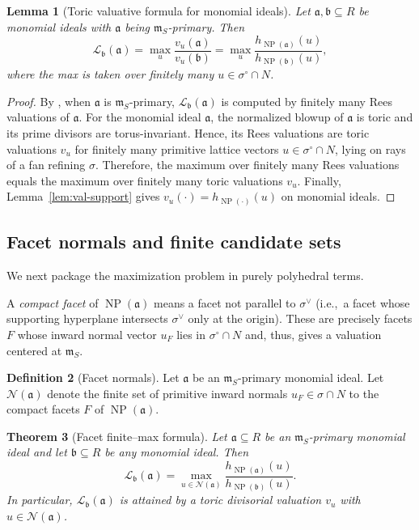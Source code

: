 \documentclass[12pt]{amsart}
\newcommand{\m}{\mathfrak m}
\renewcommand{\a}{\mathfrak{a}}
\renewcommand{\b}{\mathfrak{b}}
\newcommand{\Loj}{\mathcal{L}} %
\DeclareMathOperator{\NP}{NP}
\theoremstyle{plain}
\newtheorem{theorem}{Theorem}[section]
\newtheorem{lemma}[theorem]{Lemma}
\theoremstyle{definition}
\newtheorem{definition}[theorem]{Definition}
\numberwithin{equation}{section}
\begin{document}
\begin{lemma}[Toric valuative formula for monomial ideals]\label{prop:toric-valuative}
	Let $\a,\b\subseteq R$ be monomial ideals with $\a$ being $\m_S$-primary.
	Then
	\[
	\Loj_{\b}(\a)
	=
	\max_u \frac{v_u(\a)}{v_u(\b)}
	=
	\max_u \frac{h_{\NP(\a)}(u)}{h_{\NP(\b)}(u)},
	\]
	where the max is taken over finitely many $u \in \sigma^\circ \cap N$.
\end{lemma}

\begin{proof}
	By , when $\a$ is $\m_S$-primary,
	$\Loj_{\b}(\a)$ is computed by finitely many Rees valuations of $\a$.
	For the monomial ideal $\a$, the normalized blowup of $\a$ is toric and its prime divisors
	are torus-invariant. Hence, its Rees valuations are toric valuations $v_u$
	for finitely many primitive lattice vectors $u \in \sigma^\circ \cap N$, lying on rays of a fan refining $\sigma$.
	Therefore, the maximum over finitely many Rees valuations equals the maximum over finitely many toric
	valuations $v_u$.
	Finally, Lemma~\ref{lem:val-support} gives $v_u(\cdot)=h_{\NP(\cdot)}(u)$ on monomial ideals.
\end{proof}

\subsection{Facet normals and finite candidate sets}

We next package the maximization problem in purely polyhedral terms.

A \emph{compact facet} of $\NP(\a)$ means a facet not parallel to $\sigma^\vee$
(i.e.,\ a facet whose supporting hyperplane intersects $\sigma^\vee$ only at the origin).
These are precisely facets $F$ whose inward normal vector $u_F$ lies in $\sigma^\circ \cap N$ and, thus, gives a valuation centered at $\m_S$.

\begin{definition}[Facet normals]\label{def:facet-normals}
	Let $\a$ be an $\m_S$-primary monomial ideal.
	Let $\mathcal N(\a)$ denote the finite set of primitive inward normals $u_F\in\sigma\cap N$
	to the compact facets $F$ of $\NP(\a)$.
\end{definition}

\begin{theorem}[Facet finite--max formula]\label{thm:facet-formula}
	Let $\a\subseteq R$ be an $\m_S$-primary monomial ideal and let $\b\subseteq R$ be any monomial ideal.
	Then
	\[
	\Loj_{\b}(\a)
	=
	\max_{u\in\mathcal N(\a)}\frac{h_{\NP(\a)}(u)}{h_{\NP(\b)}(u)}.
	\]
	In particular, $\Loj_{\b}(\a)$ is attained by a toric divisorial valuation
	$v_u$ with $u\in\mathcal N(\a)$.
\end{theorem}
\end{document}
